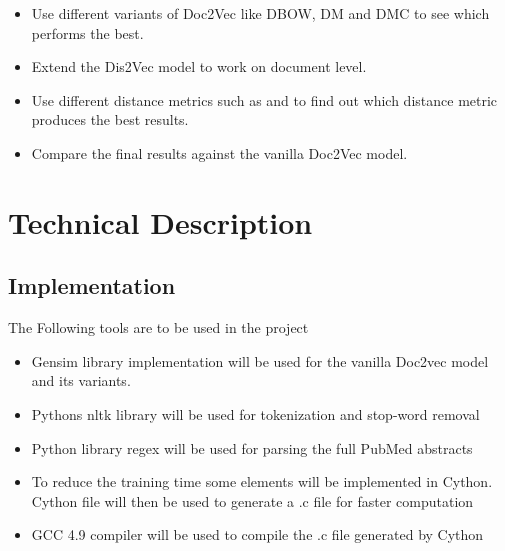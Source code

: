 \documentclass[12pt,a4paper] {article}
\begin{document}
\begin{itemize}
\begin{itemize}
\begin{itemize}
			\end{itemize} 
			
		\end{itemize}
		

		\item Use different variants of Doc2Vec like DBOW, DM and DMC to see which performs the best.
		
		
		\item Extend the Dis2Vec \cite{ghosh2016characterizing} model to work on document level.
		
		\item Use different distance metrics such as \cite{sidorov2014soft} \cite{kusner2015word} and \cite{annoy} to find out which distance metric produces the best results.
		
		\item Compare the final results against the vanilla Doc2Vec model.
		
		
	\end{itemize}
	
	
	
	\section*{Technical Description} 
	\subsection*{Implementation}
	The Following tools are to be used in the project
	
	\begin{itemize}
		\item Gensim library \cite{rehurek_lrec} implementation will be used for the vanilla Doc2vec model and its variants. 
		
		\item Pythons nltk library will be used for tokenization and stop-word removal
		
		\item Python library regex will be used for parsing the full PubMed abstracts 
		
		\item To reduce the training time some elements will be implemented in Cython. Cython file will then be used to generate a .c file for faster computation
		
		\item GCC 4.9 compiler will be used to compile the .c file generated by Cython 
		
		
	\end{itemize}
	
\end{document}
